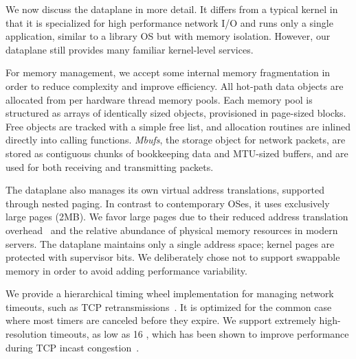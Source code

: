 We now discuss the \ix dataplane in more detail. It differs from a typical
kernel in that it is specialized for high performance network I/O and runs only a single
application, similar to a library OS but with memory
isolation. However, our dataplane still provides many
familiar kernel-level services.

For memory management, we accept some internal memory fragmentation in order to
reduce complexity and improve efficiency. All hot-path data objects
are allocated from per hardware thread memory pools. Each memory pool
is structured as arrays of identically sized objects, provisioned in
page-sized blocks. Free objects are tracked with a simple free list,
and allocation routines are inlined directly into calling
functions. \emph{Mbufs}, the storage object for network packets, are stored
as contiguous chunks of bookkeeping data and MTU-sized buffers, and
are used for both receiving and transmitting packets.

The dataplane also manages its own virtual address translations,
supported through nested paging. In contrast to contemporary OSes, it
uses exclusively large pages (2MB). We favor large pages due to
their reduced address translation
overhead~\cite{DBLP:conf/isca/BasuGCHS13, dune} and the relative
abundance of physical memory resources in modern servers. The
dataplane maintains only a single address space; kernel pages are
protected with supervisor bits. We deliberately chose not to support
swappable memory in order to avoid adding performance variability.

We provide a hierarchical timing wheel implementation for managing
network timeouts, such as TCP
retransmissions~\cite{DBLP:conf/sosp/VargheseL87}. It is optimized for
the common case where most timers are canceled before they expire. We
support extremely high-resolution timeouts, as low as 16 \microsecond,
which has been shown to improve performance during TCP incast
congestion~\cite{DBLP:conf/sigcomm/VasudevanPSKAGGM09}.

